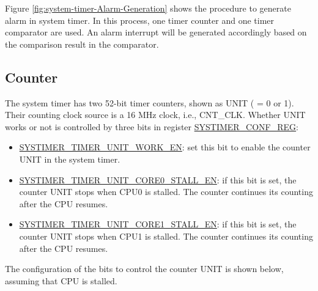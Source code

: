 \documentclass[main\_\_EN.tex]{subfiles}
\begin{document}
Figure \ref{fig:system-timer-Alarm-Generation} shows the procedure to generate alarm in system timer. In this process, one timer counter and one timer comparator are used. An alarm interrupt will be generated accordingly based on the comparison result in the comparator.


\subsection{Counter}
The system timer has two 52-bit timer counters, shown as UNIT ( = 0 or 1). Their counting clock source is a 16 MHz clock, i.e., CNT\_CLK. Whether UNIT works or not is controlled by three bits in register \hyperref[regdesc:SYSTIMERCONFREG]{SYSTIMER\_CONF\_REG}:
\begin{itemize}
    \item \hyperref[fielddesc:SYSTIMERTIMERUNIT1WORKEN]{SYSTIMER\_TIMER\_UNIT\_WORK\_EN}: set this bit to enable the counter UNIT in the system timer.
    \item \hyperref[fielddesc:SYSTIMERTIMERUNIT1CORE0STALLEN]{SYSTIMER\_TIMER\_UNIT\_CORE0\_STALL\_EN}: if this bit is set, the counter UNIT stops when CPU0 is stalled. The counter continues its counting after the CPU resumes.
    \item \hyperref[fielddesc:SYSTIMERTIMERUNIT1CORE0STALLEN]{SYSTIMER\_TIMER\_UNIT\_CORE1\_STALL\_EN}: if this bit is set, the counter UNIT stops when CPU1 is stalled. The counter continues its counting after the CPU resumes.
\end{itemize}
The configuration of the bits to control the counter UNIT is shown below, assuming that CPU is stalled.
\end{document}
